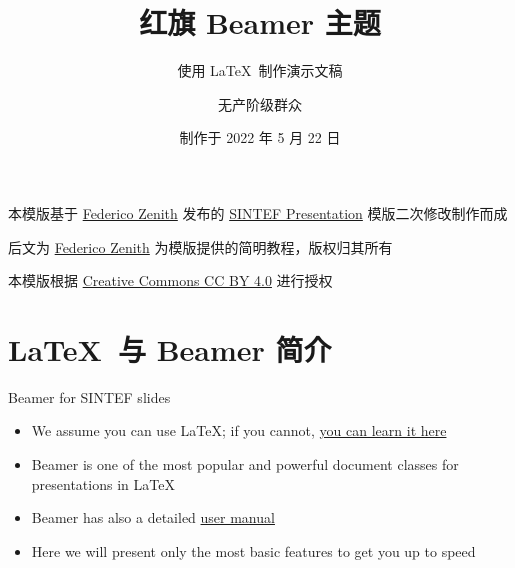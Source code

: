 \documentclass{sintefbeamer}
\title{红旗 Beamer 主题}
\subtitle{使用 \LaTeX\ 制作演示文稿}
\author{无产阶级群众}
\date{制作于 2022 年 5 月 22 日}
\newcommand{\hrefcol}[2]{\textcolor{airforceblue}{\href{#1}{#2}}}
\begin{document}
\maketitle

\begin{frame}

本模版基于 \hrefcol{mailto:federico.zenith@sintef.no}{Federico Zenith} 发布的 \hrefcol{https://www.overleaf.com/latex/templates/sintef-presentation/jhbhdffczpnx}{SINTEF Presentation} 模版二次修改制作而成\vspace{\baselineskip}

后文为 \hrefcol{mailto:federico.zenith@sintef.no}{Federico Zenith} 为模版提供的简明教程，版权归其所有\vspace{\baselineskip}

本模版根据 \hrefcol{https://creativecommons.org/licenses/by-nc/4.0/legalcode}{Creative Commons CC BY 4.0} 进行授权

\end{frame}

\section{\LaTeX\ 与 Beamer 简介}

\begin{frame}{Beamer for SINTEF slides}{\thesection \, \secname}

\begin{itemize}
\item We assume you can use \LaTeX; if you cannot,
\hrefcol{http://en.wikibooks.org/wiki/LaTeX/}{you can learn it here}
\item Beamer is one of the most popular and powerful document
classes for presentations in \LaTeX
\item Beamer has also a detailed
\hrefcol{http://www.ctan.org/tex-archive/macros/latex/contrib/beamer/doc/beameruserguide.pdf}{user manual}
\item Here we will present only the most basic features to get you up to speed
\end{itemize}
\end{frame}
\end{document}
